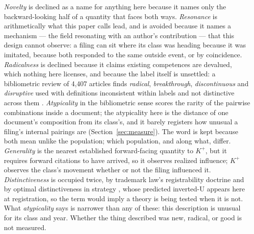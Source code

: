 \emph{Novelty} is declined as a name for anything here because it names
only the backward-looking half of a quantity that faces both ways.
\emph{Resonance} is arithmetically what this paper calls lead, and is
avoided because it names a mechanism --- the field resonating with an
author's contribution --- that this design cannot observe: a filing can
sit where its class was heading because it was imitated, because both
responded to the same outside event, or by coincidence.
\emph{Radicalness} is declined because it claims existing competences
are devalued, which nothing here licenses, and because the label itself
is unsettled: a bibliometric review of 4{,}407 articles finds
\emph{radical}, \emph{breakthrough}, \emph{discontinuous} and
\emph{disruptive} used with definitions inconsistent within labels and
not distinctive across them \citep{Verhoeven2025}. \emph{Atypicality} in
the bibliometric sense \citep{Uzzi2013, BerkesGaetani2021} scores the
rarity of the pairwise combinations inside a document; the atypicality
here is the distance of one document's composition from its class's,
and it barely registers how unusual a filing's internal pairings are
(Section~\ref{sec:measure}). The word is kept because both mean unlike
the population; which population, and along what, differ.
\emph{Generality} \citep{HallJaffe2001} is the nearest established
forward-facing quantity to $K^{+}$, but it requires forward citations to
have arrived, so it observes realized influence; $K^{+}$ observes the
class's movement whether or not the filing influenced it.
\emph{Distinctiveness} is occupied twice, by trademark law's
registrability doctrine and by optimal distinctiveness in strategy
\citep{Zhao2017}, whose predicted inverted-U appears here at
registration, so the term would imply a theory is being tested when it
is not. What \emph{atypicality} says is narrower
than any of these: this description is unusual for its class and year.
Whether the thing described was new, radical, or good is not measured.
